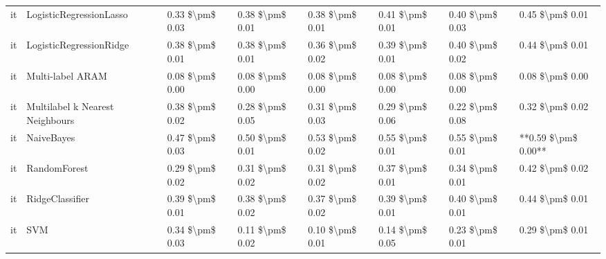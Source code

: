 \begin{tabular}{llllllll}
      it &         LogisticRegressionLasso & 0.33 \$\textbackslash pm\$ 0.03 &           0.38 \$\textbackslash pm\$ 0.01 &       0.38 \$\textbackslash pm\$ 0.01 &        0.41 \$\textbackslash pm\$ 0.01 &                         0.40 \$\textbackslash pm\$ 0.03 &     0.45 \$\textbackslash pm\$ 0.01 \\
      it &         LogisticRegressionRidge & 0.38 \$\textbackslash pm\$ 0.01 &           0.38 \$\textbackslash pm\$ 0.01 &       0.36 \$\textbackslash pm\$ 0.02 &        0.39 \$\textbackslash pm\$ 0.01 &                         0.40 \$\textbackslash pm\$ 0.02 &     0.44 \$\textbackslash pm\$ 0.01 \\
      it &                Multi-label ARAM & 0.08 \$\textbackslash pm\$ 0.00 &           0.08 \$\textbackslash pm\$ 0.00 &       0.08 \$\textbackslash pm\$ 0.00 &        0.08 \$\textbackslash pm\$ 0.00 &                         0.08 \$\textbackslash pm\$ 0.00 &     0.08 \$\textbackslash pm\$ 0.00 \\
      it & Multilabel k Nearest Neighbours & 0.38 \$\textbackslash pm\$ 0.02 &           0.28 \$\textbackslash pm\$ 0.05 &       0.31 \$\textbackslash pm\$ 0.03 &        0.29 \$\textbackslash pm\$ 0.06 &                         0.22 \$\textbackslash pm\$ 0.08 &     0.32 \$\textbackslash pm\$ 0.02 \\
      it &                      NaiveBayes & 0.47 \$\textbackslash pm\$ 0.03 &           0.50 \$\textbackslash pm\$ 0.01 &       0.53 \$\textbackslash pm\$ 0.02 &        0.55 \$\textbackslash pm\$ 0.01 &                         0.55 \$\textbackslash pm\$ 0.01 & **0.59 \$\textbackslash pm\$ 0.00** \\
      it &                    RandomForest & 0.29 \$\textbackslash pm\$ 0.02 &           0.31 \$\textbackslash pm\$ 0.02 &       0.31 \$\textbackslash pm\$ 0.02 &        0.37 \$\textbackslash pm\$ 0.01 &                         0.34 \$\textbackslash pm\$ 0.01 &     0.42 \$\textbackslash pm\$ 0.02 \\
      it &                 RidgeClassifier & 0.39 \$\textbackslash pm\$ 0.01 &           0.38 \$\textbackslash pm\$ 0.02 &       0.37 \$\textbackslash pm\$ 0.02 &        0.39 \$\textbackslash pm\$ 0.01 &                         0.40 \$\textbackslash pm\$ 0.01 &     0.44 \$\textbackslash pm\$ 0.01 \\
      it &                             SVM & 0.34 \$\textbackslash pm\$ 0.03 &           0.11 \$\textbackslash pm\$ 0.02 &       0.10 \$\textbackslash pm\$ 0.01 &        0.14 \$\textbackslash pm\$ 0.05 &                         0.23 \$\textbackslash pm\$ 0.01 &     0.29 \$\textbackslash pm\$ 0.01 \\

\end{tabular}
